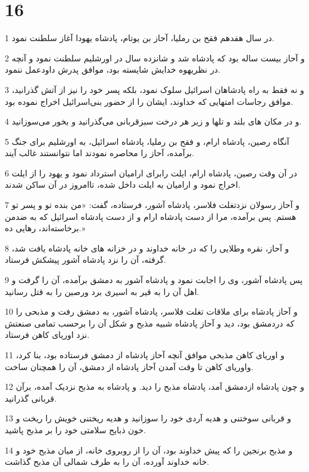 \chapter{16}

\par 1 در سال هفدهم فقح بن رملیا، آحاز بن یوتام، پادشاه یهودا آغاز سلطنت نمود. 
\par 2 و آحاز بیست ساله بود که پادشاه شد و شانزده سال در اورشلیم سلطنت نمود و آنچه در نظریهوه خدایش شایسته بود، موافق پدرش داودعمل ننمود.
\par 3 و نه فقط به راه پادشاهان اسرائیل سلوک نمود، بلکه پسر خود را نیز از آتش گذرانید، موافق رجاسات امتهایی که خداوند، ایشان را از حضور بنی‌اسرائیل اخراج نموده بود.
\par 4 و در مکان های بلند و تلها و زیر هر درخت سبزقربانی می‌گذرانید و بخور می‌سوزانید.
\par 5 آنگاه رصین، پادشاه ارام، و فقح بن رملیا، پادشاه اسرائیل، به اورشلیم برای جنگ برآمده، آحاز را محاصره نمودند اما نتوانستند غالب آیند.
\par 6 در آن وقت رصین، پادشاه ارام، ایلت رابرای ارامیان استرداد نمود و یهود را از ایلت اخراج نمود و ارامیان به ایلت داخل شده، تاامروز در آن ساکن شدند.
\par 7 و آحاز رسولان نزدتغلت فلاسر، پادشاه آشور، فرستاده، گفت: «من بنده تو و پسر تو هستم. پس برآمده، مرا از دست پادشاه ارام و از دست پادشاه اسرائیل که به ضدمن برخاسته‌اند، رهایی ده.»
\par 8 و آحاز، نقره وطلایی را که در خانه خداوند و در خزانه های خانه پادشاه یافت شد، گرفته، آن را نزد پادشاه آشور پیشکش فرستاد.
\par 9 پس پادشاه آشور، وی را اجابت نمود و پادشاه آشور به دمشق برآمده، آن را گرفت و اهل آن را به قیر به اسیری برد ورصین را به قتل رسانید.
\par 10 و آحاز پادشاه برای ملاقات تغلت فلاسر، پادشاه آشور، به دمشق رفت و مذبحی را که دردمشق بود، دید و آحاز پادشاه شبیه مذبح و شکل آن را بر‌حسب تمامی صنعتش نزد اوریای کاهن فرستاد.
\par 11 و اوریای کاهن مذبحی موافق آنچه آحاز پادشاه از دمشق فرستاده بود، بنا کرد، واوریای کاهن تا وقت آمدن آحاز پادشاه از دمشق، آن را همچنان ساخت.
\par 12 و چون پادشاه ازدمشق آمد، پادشاه مذبح را دید. و پادشاه به مذبح نزدیک آمده، برآن قربانی گذرانید.
\par 13 و قربانی سوختنی و هدیه آردی خود را سوزانید و هدیه ریختنی خویش را ریخت و خون ذبایح سلامتی خود را بر مذبح پاشید.
\par 14 و مذبح برنجین را که پیش خداوند بود، آن را از روبروی خانه، از میان مذبح خود و خانه خداوند آورده، آن را به طرف شمالی آن مذبح گذاشت.
